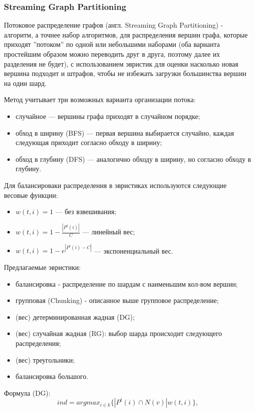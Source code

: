 \subsubsection{Streaming Graph Partitioning}
Потоковое распределение графов \cite{SGP} (англ. Streaming Graph Partitioning) - алгоритм, а точнее набор алгоритмов, для распределения вершин графа, которые приходят ''потоком'' по одной или небольшими наборами (оба варианта простейшим образом можно переводить друг в друга, поэтому далее их разделения не будет), с использованием эвристик для оценки насколько новая вершина подходит и штрафов, чтобы не избежать загрузки большинства вершин на один шард.

Метод учитывает три возможных варианта организации потока:
\begin{itemize}
    \item случайное --- вершины графа приходят в случайном порядке;
    \item обход в ширину (BFS) --- первая вершина выбирается случайно, каждая следующая приходит согласно обходу в ширину;
    \item обход в глубину (DFS) --- аналогично обходу в ширину, но согласно обходу в глубину.
\end{itemize}

Для балансироваки распределения в эвристиках используются следующие весовые функции:
\begin{itemize}
    \item $w(t,i)=1$ --- без взвешивания;
    \item $w(t,i)=1-\frac{|P^t(i)|}{C}$ --- линейный вес;
    \item $w(t,i)=1-e^{|P^t(i)-C|}$ --- экспоненциальный вес.
\end{itemize}

Предлагаемые эвристики:
\begin{itemize}
    \item балансировка - распределение по шардам с наименьшим кол-вом вершин;
    \item групповая (Chunking) - описанное выше групповое распределение;
    \item (вес) детерминированная жадная (DG);
    \item (вес) случайная жадная (RG): выбор шарда происходит следующего распределения;
    \item (вес) треугольники;
    \item балансировка большого.
\end{itemize}

Формула (DG): 
\begin{equation*}
    ind=arg max_{i\in k}\{|P^t(i)\cap N(v)|w(t,i)\},
\end{equation*}

